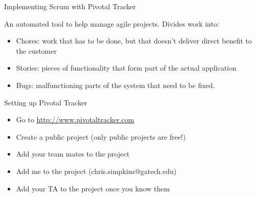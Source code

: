 \documentclass{beamer}
\begin{document}
\begin{frame}[fragile]{Implementing Scrum with Pivotal Tracker}


An automated tool to help manage agile projects.
Divides work into:
\begin{itemize}
\item Chores:  work that has to be done, but that doesn't deliver direct benefit to the customer
\item Stories:  pieces of functionality that form part of the actual application
\item Bugs:  malfunctioning parts of the system that need to be fixed.
\end{itemize}


\end{frame}

\begin{frame}[fragile]{Setting up Pivotal Tracker}


\begin{itemize}
\item Go to \url{http://www.pivotaltracker.com}
\item Create a public project (only public projects are free!)
\item Add your team mates to the project
\item Add me to the project (chris.simpkins@gatech.edu)
\item  Add your TA to the project once you know them
\end{itemize}


\end{frame}
\end{document}
